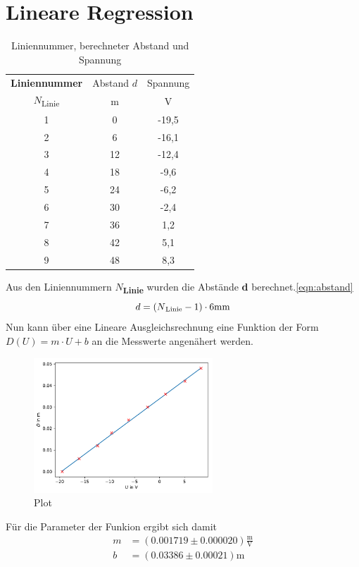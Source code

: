 \documentclass[titlepage = firstcover]{scrartcl}
\begin{document}
\section{Lineare Regression}
\begin{table}[H]
    \centering
    \begin{tabular}{c c c}
        \toprule
        \textbf{Liniennummer} & Abstand $d$ & Spannung \\
        $N$\textsubscript{Linie} & m & V \\
        \midrule
        1 & 0 & -19,5\\
        2 & 6 & -16,1\\
        3 & 12 & -12,4\\
        4 & 18 & -9,6\\
        5 & 24 & -6,2\\
        6 & 30 & -2,4\\
        7 & 36 & 1,2\\
        8 & 42 & 5,1\\
        9 & 48 & 8,3\\
        \bottomrule
    \end{tabular}
    \caption{Liniennummer, berechneter Abstand und Spannung}
    \label{tab:Wertetabelle}
\end{table}
Aus den Liniennummern \textbf{$N$\textsubscript{Linie}} wurden die Abstände \textbf{d} berechnet.\ref{eqn:abstand}
\begin{equation}
    d = (N\text{\textsubscript{Linie}}-1)\cdot 6 \text{mm}
    \label{eqn:abstand}
\end{equation}
Nun kann über eine Lineare Ausgleichsrechnung eine Funktion der Form $D(U) = m\cdot U + b$ an die Messwerte angenähert werden.
\begin{figure}[H]
    \center
    \includegraphics[width=0.6\textwidth]{build/plot.pdf}
    \caption{Plot}
    \label{tab:LF_D}
\end{figure}
Für die Parameter der Funkion ergibt sich damit
\begin{align*}
    m &= (0.001719 \pm 0.000020) \frac{\text{m}}{\text{V}}\\
    b &= \left(0.03386 \pm 0.00021\right) \text{m}
\end{align*}
\end{document}
